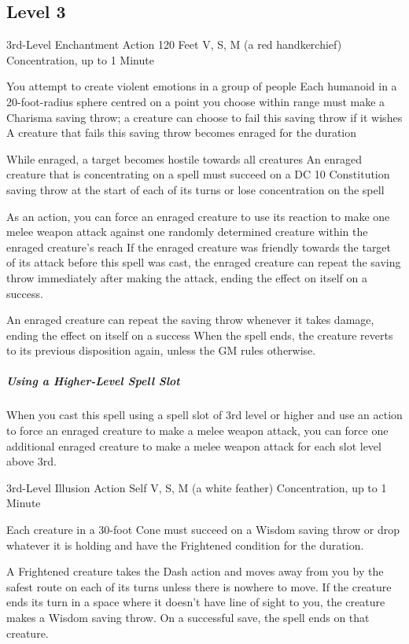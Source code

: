 \documentclass[letterpaper,openany,oneside,twocolumn]{book}
\begin{document}
\subsection*{Level 3}
	{3rd-Level Enchantment}
	{Action}
	{120 Feet}
	{V, S, M (a red handkerchief)}
	{Concentration, up to 1 Minute}

You attempt to create violent emotions in a group of people Each humanoid in a 20-foot-radius sphere centred on a point you choose within range must make a Charisma saving throw; a creature can choose to fail this saving throw if it wishes A creature that fails this saving throw becomes enraged for the duration

While enraged, a target becomes hostile towards all creatures An enraged creature that is concentrating on a spell must succeed on a DC 10 Constitution saving throw at the start of each of its turns or lose concentration on the spell

As an action, you can force an enraged creature to use its reaction to make one melee weapon attack against one randomly determined creature within the enraged creature's reach If the enraged creature was friendly towards the target of its attack before this spell was cast, the enraged creature can repeat the saving throw immediately after making the attack, ending the effect on itself on a success.

An enraged creature can repeat the saving throw whenever it takes damage, ending the effect on itself on a success When the spell ends, the creature reverts to its previous disposition again, unless the GM rules otherwise.

\subparagraph*{Using a Higher-Level Spell Slot} When you cast this spell using a spell slot of 3rd level or higher and use an action to force an enraged creature to make a melee weapon attack, you can force one additional enraged creature to make a melee weapon attack for each slot level above 3rd.

	{3rd-Level Illusion}
	{Action}
	{Self}
	{V, S, M (a white feather)}
	{Concentration, up to 1 Minute}

Each creature in a 30-foot Cone must succeed on a Wisdom saving throw or drop whatever it is holding and have the Frightened condition for the duration.

A Frightened creature takes the Dash action and moves away from you by the safest route on each of its turns unless there is nowhere to move. If the creature ends its turn in a space where it doesn't have line of sight to you, the creature makes a Wisdom saving throw. On a successful save, the spell ends on that creature.
\end{document}
